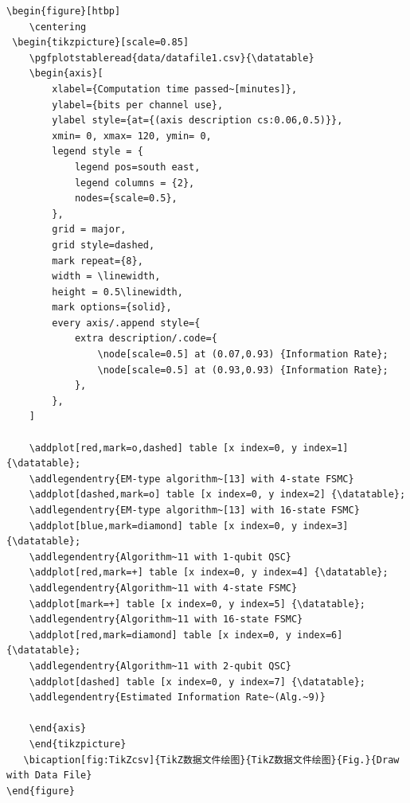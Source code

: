 {\wuhao
\begin{lstlisting}
\begin{figure}[htbp]
    \centering
 \begin{tikzpicture}[scale=0.85]
    \pgfplotstableread{data/datafile1.csv}{\datatable}
    \begin{axis}[
        xlabel={Computation time passed~[minutes]},
        ylabel={bits per channel use},
        ylabel style={at={(axis description cs:0.06,0.5)}},
        xmin= 0, xmax= 120, ymin= 0,
        legend style = {
            legend pos=south east,
            legend columns = {2},
            nodes={scale=0.5},
        },
        grid = major,
        grid style=dashed,
        mark repeat={8},
        width = \linewidth,
        height = 0.5\linewidth,
        mark options={solid},
        every axis/.append style={
            extra description/.code={
                \node[scale=0.5] at (0.07,0.93) {Information Rate};
                \node[scale=0.5] at (0.93,0.93) {Information Rate};
            },
        },
    ]

    \addplot[red,mark=o,dashed] table [x index=0, y index=1] {\datatable};
    \addlegendentry{EM-type algorithm~[13] with 4-state FSMC}
    \addplot[dashed,mark=o] table [x index=0, y index=2] {\datatable};
    \addlegendentry{EM-type algorithm~[13] with 16-state FSMC}
    \addplot[blue,mark=diamond] table [x index=0, y index=3] {\datatable};
    \addlegendentry{Algorithm~11 with 1-qubit QSC}
    \addplot[red,mark=+] table [x index=0, y index=4] {\datatable};
    \addlegendentry{Algorithm~11 with 4-state FSMC}
    \addplot[mark=+] table [x index=0, y index=5] {\datatable};
    \addlegendentry{Algorithm~11 with 16-state FSMC}
    \addplot[red,mark=diamond] table [x index=0, y index=6] {\datatable};
    \addlegendentry{Algorithm~11 with 2-qubit QSC}
    \addplot[dashed] table [x index=0, y index=7] {\datatable};
    \addlegendentry{Estimated Information Rate~(Alg.~9)}

    \end{axis}
    \end{tikzpicture}
   \bicaption[fig:TikZcsv]{TikZ数据文件绘图}{TikZ数据文件绘图}{Fig.}{Draw with Data File}
\end{figure}
\end{lstlisting}
}

